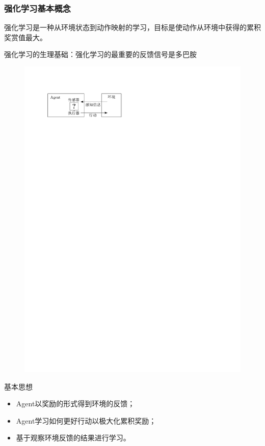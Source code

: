 \subsubsection{强化学习基本概念}
\begin{definition}[强化学习]
    强化学习是一种从环境状态到动作映射的学习，目标是使动作从环境中获得的累积奖赏值最大。

    强化学习的生理基础：强化学习的最重要的反馈信号是多巴胺
    \begin{figure}[htbp]
        \centering
        \includegraphics{image/Agent.pdf}
    \end{figure}
    基本思想
    \begin{itemize}
        \item Agent以奖励的形式得到环境的反馈；
        \item Agent学习如何更好行动以极大化累积奖励；
        \item 基于观察环境反馈的结果进行学习。
    \end{itemize}
\end{definition}
